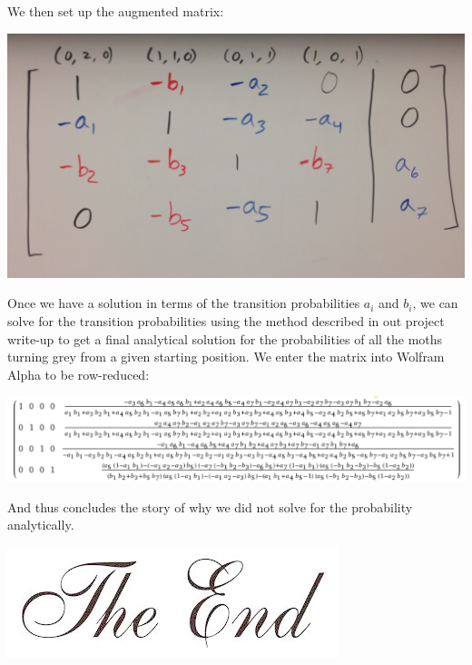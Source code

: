 \documentclass[11pt]{article}
\begin{document}
We then set up the augmented matrix:

\begin{center}
\includegraphics[scale=0.1]{matrix}
\end{center}

Once we have a solution in terms of the transition probabilities $a_i$ and $b_i$, we can solve for the transition probabilities using the method described in out project write-up to get a final analytical solution for the probabilities of all the moths turning grey from a given starting position. We enter the matrix into Wolfram Alpha to be row-reduced:
\begin{center}
\includegraphics[scale=0.6]{wolfram}
\end{center}
And thus concludes the story of why we did not solve for the probability analytically.
\begin{center}
\includegraphics[scale=0.5]{the-end}
\end{center}
\end{document}
